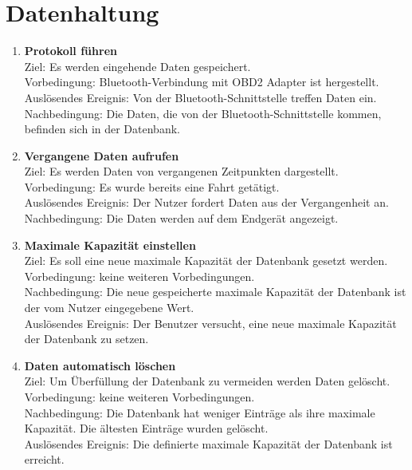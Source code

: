 \documentclass[pflichtenheft.tex]{subfiles}
\begin{document}
	\section{Datenhaltung}

	\begin{enumerate}
		\setcounter{enumi}{\value{enumTemp}}
		\item{\textbf{Protokoll führen}} \\ Ziel: Es werden eingehende Daten gespeichert.\\
		Vorbedingung: Bluetooth-Verbindung mit OBD2 Adapter ist hergestellt. \\ Auslösendes Ereignis: Von der Bluetooth-Schnittstelle treffen Daten ein.\\%
		Nachbedingung: Die Daten, die von der Bluetooth-Schnittstelle kommen, befinden sich in der Datenbank.
		
		\item{\textbf{Vergangene Daten aufrufen}} \label{pastData} \\ Ziel: Es werden Daten von vergangenen Zeitpunkten dargestellt. \\ Vorbedingung: Es wurde bereits eine Fahrt getätigt.\\
		Auslösendes Ereignis: Der Nutzer fordert Daten aus der Vergangenheit an.\\
		Nachbedingung: Die Daten werden auf dem Endgerät angezeigt.
	
		\item{\textbf{Maximale Kapazität einstellen}}\\
		Ziel: Es soll eine neue maximale Kapazität der Datenbank gesetzt werden. \\ Vorbedingung: keine weiteren Vorbedingungen.\\
		Nachbedingung: Die neue gespeicherte maximale Kapazität der Datenbank ist der vom Nutzer eingegebene Wert.\\
		Auslösendes Ereignis: Der Benutzer versucht, eine neue maximale Kapazität der Datenbank zu setzen. 
		
		\item{\textbf{Daten automatisch löschen}} \label{deleteData} \\ Ziel: Um Überfüllung der Datenbank zu vermeiden werden Daten gelöscht. \\ Vorbedingung: keine weiteren Vorbedingungen.\\ Nachbedingung: Die Datenbank hat weniger Einträge als ihre maximale Kapazität. Die ältesten Einträge wurden gelöscht.\\
		Auslösendes Ereignis: Die definierte maximale Kapazität der Datenbank ist erreicht. 


\end{enumerate}
\end{document}
